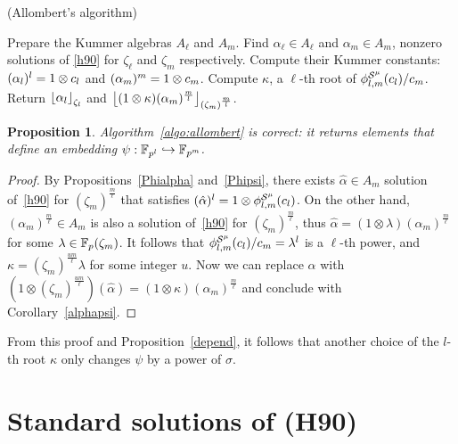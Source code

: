 \documentclass{sig-alternate}
\newtheorem{proposition}[theorem]{Proposition}
\begin{document}
\begin{algorithm}
  \caption{(Allombert's algorithm)}
  \label{algo:allombert}
  \begin{algorithmic}[1]
  \STATE Prepare the Kummer algebras $A_\ell$ and $A_m$.
  \STATE Find $\alpha_\ell\in A_\ell$ and $\alpha_m\in A_m$, nonzero solutions of \eqref{h90} for $\zeta_\ell$
  and $\zeta_m$ respectively.
  \STATE Compute their Kummer constants: $(\alpha_l)^l=1\otimes c_l$ and
  $(\alpha_m)^m=1\otimes c_m$.
  \STATE Compute $\kappa$, a $\ell$-th root of ${\phi^{\mathcal{S}^\mu}_{{l},{m}}}(c_l)/c_m$.
  \STATE Return $\left\lfloor \alpha_{l} \right\rfloor_{\zeta_l}$ and $\left\lfloor (1\otimes\kappa)(\alpha_m)^{\frac{m}{l}} \right\rfloor_{(\zeta_m)^{\frac{m}{l}}}$.
  \end{algorithmic}
\end{algorithm}
\begin{proposition}
  Algorithm~\ref{algo:allombert} is correct: it returns elements that define an
  embedding $\psi:\mathbb{F}_{p^l}\hookrightarrow\mathbb{F}_{p^m}$.
\end{proposition}
\begin{proof}
By Propositions~\ref{Phialpha} and~\ref{Phipsi}, there exists $\hat{\alpha}\in A_m$
solution of~\eqref{h90} for $(\zeta_m)^{\frac{m}{\ell}}$ that satisfies $(\hat{\alpha})^l=1\otimes{\phi^{\mathcal{S}^\mu}_{{l},{m}}}(c_l)$.
On the other hand, $(\alpha_m)^{\frac{m}{\ell}}\in A_m$ is also a solution of~\eqref{h90} for $(\zeta_m)^{\frac{m}{\ell}}$,
thus $\hat{\alpha}=(1\otimes\lambda)(\alpha_m)^{\frac{m}{\ell}}$ for some $\lambda\in\mathbb{F}_{p}(\zeta_m)$.
It follows that ${\phi^{\mathcal{S}^\mu}_{{l},{m}}}(c_l)/c_m=\lambda^l$ is a $\ell$-th power,
and $\kappa = (\zeta_{m})^{\frac{um}{\ell}}\lambda$ for some integer $u$.
Now we can replace $\hat{\alpha}$
with $(1\otimes(\zeta_{m})^{\frac{um}{\ell}})(\hat{\alpha})=(1\otimes\kappa)(\alpha_m)^{\frac{m}{\ell}}$
and conclude with Corollary~\ref{alphapsi}.
\end{proof}
From this proof and Proposition~\ref{depend}, it follows that another choice of the $l$-th root $\kappa$
only changes $\psi$ by a power of $\sigma$.
    
\section{Standard solutions of (H90)}
\label{sec:compatibleH90}
\end{document}
